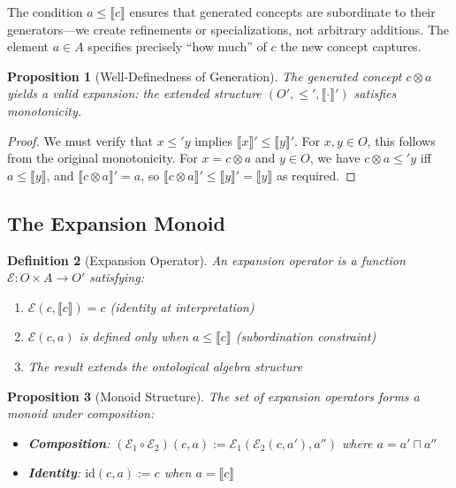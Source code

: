 \documentclass[12pt,a4paper]{article}
\newtheorem{definition}{Definition}[section]
\newtheorem{proposition}[definition]{Proposition}
\newcommand{\sem}[1]{\llbracket #1 \rrbracket}
\begin{document}
The condition $a \leq \sem{c}$ ensures that generated concepts are subordinate to their generators---we create refinements or specializations, not arbitrary additions. The element $a \in A$ specifies precisely ``how much'' of $c$ the new concept captures.

\begin{proposition}[Well-Definedness of Generation]
The generated concept $c \otimes a$ yields a valid expansion: the extended structure $(O', \leq', \sem{\cdot}')$ satisfies monotonicity.
\end{proposition}

\begin{proof}
We must verify that $x \leq' y$ implies $\sem{x}' \leq \sem{y}'$. For $x, y \in O$, this follows from the original monotonicity. For $x = c \otimes a$ and $y \in O$, we have $c \otimes a \leq' y$ iff $a \leq \sem{y}$, and $\sem{c \otimes a}' = a$, so $\sem{c \otimes a}' \leq \sem{y}' = \sem{y}$ as required.
\end{proof}

\subsection{The Expansion Monoid}

\begin{definition}[Expansion Operator]
An \emph{expansion operator} is a function $\mathcal{E} : O \times A \to O'$ satisfying:
\begin{enumerate}
    \item $\mathcal{E}(c, \sem{c}) = c$ (identity at interpretation)
    \item $\mathcal{E}(c, a)$ is defined only when $a \leq \sem{c}$ (subordination constraint)
    \item The result extends the ontological algebra structure
\end{enumerate}
\end{definition}

\begin{proposition}[Monoid Structure]
The set of expansion operators forms a monoid under composition:
\begin{itemize}
    \item \textbf{Composition}: $(\mathcal{E}_1 \circ \mathcal{E}_2)(c, a) := \mathcal{E}_1(\mathcal{E}_2(c, a'), a'')$ where $a = a' \sqcap a''$
    \item \textbf{Identity}: $\text{id}(c, a) := c$ when $a = \sem{c}$
\end{itemize}
\end{proposition}
\end{document}
